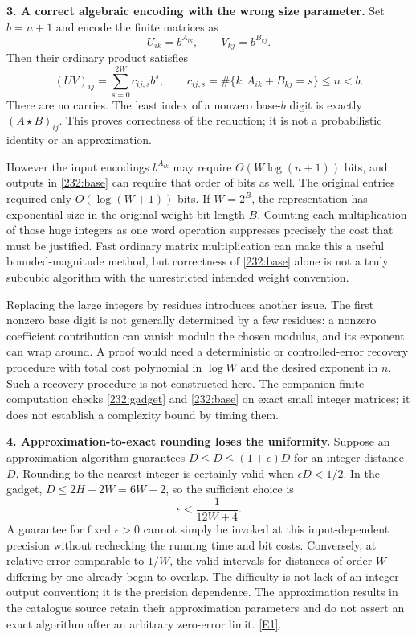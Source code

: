 \documentclass[11pt,a4paper]{article}
\newcommand{\eref}[2]{\hyperlink{extra:#1:#2}{[E#2]}}
\numberwithin{equation}{section}
\begin{document}
\textbf{3. A correct algebraic encoding with the wrong size parameter.}
Set $b=n+1$ and encode the finite matrices as
\[
 U_{ik}=b^{A_{ik}},\qquad V_{kj}=b^{B_{kj}}.
\]
Then their ordinary product satisfies
\begin{equation}\label{232:base}
 (UV)_{ij}=\sum_{s=0}^{2W}c_{ij,s}b^s,
 \qquad c_{ij,s}=\#\{k:A_{ik}+B_{kj}=s\}\leq n<b.
\end{equation}
There are no carries. The least index of a nonzero base-$b$ digit is
exactly $(A\star B)_{ij}$. This proves correctness of the reduction; it
is not a probabilistic identity or an approximation.

However the input encodings $b^{A_{ik}}$ may require
$\Theta(W\log(n+1))$ bits, and outputs in \eqref{232:base} can require
that order of bits as well. The original entries required only
$O(\log(W+1))$ bits. If $W=2^B$, the representation has exponential
size in the original weight bit length $B$. Counting each multiplication
of those huge integers as one word operation suppresses precisely the
cost that must be justified. Fast ordinary matrix multiplication can
make this a useful bounded-magnitude method, but correctness of
\eqref{232:base} alone is not a truly subcubic algorithm with the
unrestricted intended weight convention.

Replacing the large integers by residues introduces another issue. The
first nonzero base digit is not generally determined by a few residues:
a nonzero coefficient contribution can vanish modulo the chosen modulus,
and its exponent can wrap around. A proof would need a deterministic
or controlled-error recovery procedure with total cost polynomial in
$\log W$ and the desired exponent in $n$. Such a recovery procedure is
not constructed here. The companion finite computation checks
\eqref{232:gadget} and \eqref{232:base} on exact small integer matrices;
it does not establish a complexity bound by timing them.

\textbf{4. Approximation-to-exact rounding loses the uniformity.}
Suppose an approximation algorithm guarantees
$D\leq\widetilde D\leq(1+\epsilon)D$ for an integer distance $D$.
Rounding to the nearest integer is certainly valid when
$\epsilon D<1/2$. In the gadget, $D\leq2H+2W=6W+2$,
so the sufficient choice is
\begin{equation}\label{232:rounding}
 \epsilon<\frac1{12W+4}.
\end{equation}
A guarantee for fixed $\epsilon>0$ cannot simply be invoked at this
input-dependent precision without rechecking the running time and bit
costs. Conversely, at relative error comparable to $1/W$, the valid
intervals for distances of order $W$ differing by one already begin to
overlap. The difficulty is not lack of an integer output convention;
it is the precision dependence. The approximation results in the
catalogue source retain their approximation parameters and do not assert
an exact algorithm after an arbitrary zero-error limit.
\eref{232}{1}.
\end{document}
